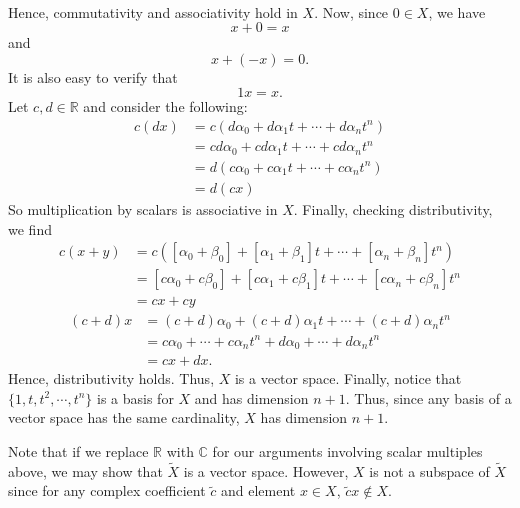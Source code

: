 \documentclass{article}
\begin{document}
\begin{itemize}
\begin{align*}
    \end{align*}
    Hence, commutativity and associativity hold in $X$. Now, since $0 \in X$, we have 
    \[x + 0 = x\]
    and 
    \[x + (-x) = 0.\]
    It is also easy to verify that
    \[1x = x.\]
    Let $c,d \in \mathbb{R}$ and consider the following:
    \begin{align*}
        c(dx) &= c(d\alpha_0 + d\alpha_1t + \cdots + d\alpha_nt^n)\\
        &= cd\alpha_0 + cd\alpha_1t + \cdots + cd\alpha_nt^n\\
        &= d(c\alpha_0 + c\alpha_1t + \cdots + c\alpha_nt^n)\\
        &= d(cx)
    \end{align*}
    So multiplication by scalars is associative in $X$. Finally, checking distributivity, we find
    \begin{align*}
        c(x + y) &= c([\alpha_0 + \beta_0] + [\alpha_1 + \beta_1]t + \cdots + [\alpha_n + \beta_n]t^n)\\
        &= [c\alpha_0 + c\beta_0] + [c\alpha_1 + c\beta_1]t + \cdots + [c\alpha_n + c\beta_n]t^n\\
        &= cx + cy
    \end{align*}
    \begin{align*}
        (c + d)x &= (c+d)\alpha_0 + (c+d)\alpha_1t + \cdots + (c+d)\alpha_nt^n\\
        &= c\alpha_0 + \cdots + c\alpha_nt^n + d\alpha_0 + \cdots + d\alpha_nt^n\\
        &= cx + dx.
    \end{align*}
    Hence, distributivity holds. Thus, $X$ is a vector space.
    \newline
    Finally, notice that $\{1, t, t^2, \cdots, t^n\}$ is a basis for $X$ and has dimension $n+1$. Thus, since any basis of a vector space has the same cardinality, $X$ has dimension $n+1$.
    \newline\newline


    Note that if we replace $\mathbb{R}$ with $\mathbb{C}$ for our arguments involving scalar multiples above, we may show that $\tilde{X}$ is a vector space. However, $X$ is not a subspace of $\tilde{X}$ since for any complex coefficient $\tilde{c}$ and element $x \in X$, $\tilde{c}x \notin X$.
    

    


\end{itemize}
\end{document}
